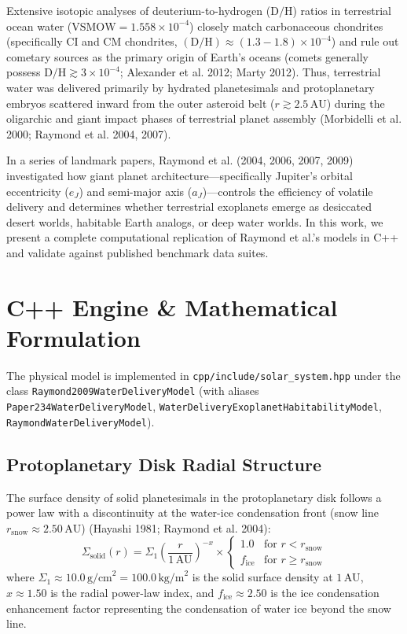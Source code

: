\documentclass[11pt,a4paper]{article}
\begin{document}
Extensive isotopic analyses of deuterium-to-hydrogen ($\text{D/H}$) ratios in terrestrial ocean water ($\text{VSMOW} = 1.558 \times 10^{-4}$) closely match carbonaceous chondrites (specifically CI and CM chondrites, $(\text{D/H}) \approx (1.3 - 1.8) \times 10^{-4}$) and rule out cometary sources as the primary origin of Earth's oceans (comets generally possess $\text{D/H} \gtrsim 3 \times 10^{-4}$; Alexander et al. 2012; Marty 2012). Thus, terrestrial water was delivered primarily by hydrated planetesimals and protoplanetary embryos scattered inward from the outer asteroid belt ($r \gtrsim 2.5\,\text{AU}$) during the oligarchic and giant impact phases of terrestrial planet assembly (Morbidelli et al. 2000; Raymond et al. 2004, 2007).

In a series of landmark papers, Raymond et al. (2004, 2006, 2007, 2009) investigated how giant planet architecture---specifically Jupiter's orbital eccentricity ($e_J$) and semi-major axis ($a_J$)---controls the efficiency of volatile delivery and determines whether terrestrial exoplanets emerge as desiccated desert worlds, habitable Earth analogs, or deep water worlds. In this work, we present a complete computational replication of Raymond et al.'s models in C++ and validate against published benchmark data suites.

\section{C++ Engine \& Mathematical Formulation}
The physical model is implemented in \texttt{cpp/include/solar\_system.hpp} under the class \texttt{Raymond2009WaterDeliveryModel} (with aliases \texttt{Paper234WaterDeliveryModel}, \texttt{WaterDeliveryExoplanetHabitabilityModel}, \texttt{RaymondWaterDeliveryModel}).

\subsection{Protoplanetary Disk Radial Structure}
The surface density of solid planetesimals in the protoplanetary disk follows a power law with a discontinuity at the water-ice condensation front (snow line $r_{\text{snow}} \approx 2.50\,\text{AU}$) (Hayashi 1981; Raymond et al. 2004):
\begin{equation}
\Sigma_{\text{solid}}(r) = \Sigma_1 \left(\frac{r}{1\,\text{AU}}\right)^{-x} \times
\begin{cases}
1.0 & \text{for } r < r_{\text{snow}} \\
f_{\text{ice}} & \text{for } r \ge r_{\text{snow}}
\end{cases}
\label{eq:sigma_disk}
\end{equation}
where $\Sigma_1 \approx 10.0\,\text{g/cm}^2 = 100.0\,\text{kg/m}^2$ is the solid surface density at $1\,\text{AU}$, $x \approx 1.50$ is the radial power-law index, and $f_{\text{ice}} \approx 2.50$ is the ice condensation enhancement factor representing the condensation of water ice beyond the snow line.
\end{document}

